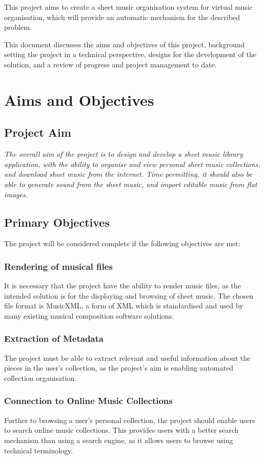 This project aims to create a sheet music organisation system for virtual music organisation, which will provide an automatic mechanism for the described problem.

This document discusses the aims and objectives of this project, background setting the project in a technical perspective, designs for the development of the solution, and a review of progress and project management to date. 
\pagebreak
\section{Aims and Objectives}
\subsection{Project Aim}
\begin{center}
\textit{The overall aim of the project is to design and develop a sheet music library application, with the ability to organise and view personal sheet music collections, and download sheet music from the internet. Time permitting, it should also be able to generate sound from the sheet music, and import editable music from flat images.}
\end{center}
\subsection{Primary Objectives}
The project will be considered complete if the following objectives are met:
\subsubsection{Rendering of musical files}
It is necessary that the project have the ability to render music files, as the intended solution is for the displaying and browsing of sheet music. The chosen file format is MusicXML, a form of XML which is standardised and used by many existing musical composition software solutions.
\subsubsection{Extraction of Metadata}
The project must be able to extract relevant and useful information about the pieces in the user's collection, as the project's aim is enabling automated collection organisation. 
\subsubsection{Connection to Online Music Collections}
Further to browsing a user's personal collection, the project should enable users to search online music collections. This provides users with a better search mechanism than using a search engine, as it allows users to browse using technical terminology.
